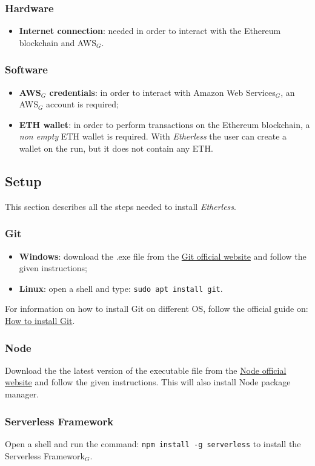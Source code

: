 \subsubsection{Hardware}
\begin{itemize}
	\item \textbf{Internet connection}: needed in order to interact with the Ethereum blockchain and AWS$_{G}$.
\end{itemize}
\subsubsection{Software}
\begin{itemize}
	\item \textbf{AWS$_{G}$ credentials}: in order to interact with Amazon Web Services$_{G}$, an AWS$_{G}$ account is required;
	\item \textbf{ETH wallet}: in order to perform transactions on the Ethereum blockchain, a \textit{non empty} ETH wallet is required. With \textit{Etherless} the user can create a wallet on the run, but it does not contain any ETH.
\end{itemize}
\subsection{Setup}
This section describes all the steps needed to install \textit{Etherless}.
\subsubsection{Git}
\begin{itemize}
	\item \textbf{Windows}: download the .exe file from the \href{https://git-scm.com/download/win}{Git official website} and follow the given instructions;
	\item \textbf{Linux}: open a shell and type: \texttt{sudo apt install git}.
\end{itemize}
	For information on how to install Git on different OS, follow the official guide on: \href{https://git-scm.com/book/en/v2/Getting-Started-Installing-Git}{How to install Git}.
\subsubsection{Node}
	Download the the latest version of the executable file from the \href{https://nodejs.org/it/download/}{Node official website} and follow the given instructions. This will also install Node package manager.
\subsubsection{Serverless Framework}
	Open a shell and run the command: \texttt{npm install -g serverless} to install the Serverless Framework$_{G}$.
